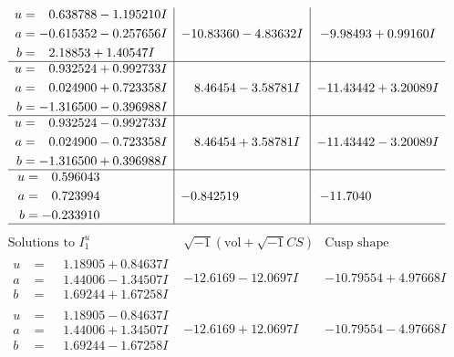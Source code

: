 \documentclass[1p]{elsarticle_modified}
\theoremstyle{definition}
\newcommand{\I}{\sqrt{-1}}
\begin{document}
$$\begin{array}{c|c|c}
\begin{aligned}
u &= \phantom{-}0.638788 - 1.195210 I \\
a &= -0.615352 - 0.257656 I \\
b &= \phantom{-}2.18853 + 1.40547 I\end{aligned}
 & -10.83360 - 4.83632 I & -9.98493 + 0.99160 I \\ \hline\begin{aligned}
u &= \phantom{-}0.932524 + 0.992733 I \\
a &= \phantom{-}0.024900 + 0.723358 I \\
b &= -1.316500 - 0.396988 I\end{aligned}
 & \phantom{-}8.46454 - 3.58781 I & -11.43442 + 3.20089 I \\ \hline\begin{aligned}
u &= \phantom{-}0.932524 - 0.992733 I \\
a &= \phantom{-}0.024900 - 0.723358 I \\
b &= -1.316500 + 0.396988 I\end{aligned}
 & \phantom{-}8.46454 + 3.58781 I & -11.43442 - 3.20089 I \\ \hline\begin{aligned}
u &= \phantom{-}0.596043\phantom{ +0.000000I} \\
a &= \phantom{-}0.723994\phantom{ +0.000000I} \\
b &= -0.233910\phantom{ +0.000000I}\end{aligned}
 & -0.842519\phantom{ +0.000000I} & -11.7040\phantom{ +0.000000I}\\
 \hline 
 \end{array}$$\newpage$$\begin{array}{c|c|c}  
\text{Solutions to }I^u_{1}& \I (\text{vol} + \sqrt{-1}CS) & \text{Cusp shape}\\
 \hline 
\begin{aligned}
u &= \phantom{-}1.18905 + 0.84637 I \\
a &= \phantom{-}1.44006 - 1.34507 I \\
b &= \phantom{-}1.69244 + 1.67258 I\end{aligned}
 & -12.6169 - 12.0697 I & -10.79554 + 4.97668 I \\ \hline\begin{aligned}
u &= \phantom{-}1.18905 - 0.84637 I \\
a &= \phantom{-}1.44006 + 1.34507 I \\
b &= \phantom{-}1.69244 - 1.67258 I\end{aligned}
 & -12.6169 + 12.0697 I & -10.79554 - 4.97668 I \\ \hline\begin{aligned}

\end{aligned}
\end{array}$$
\end{document}
